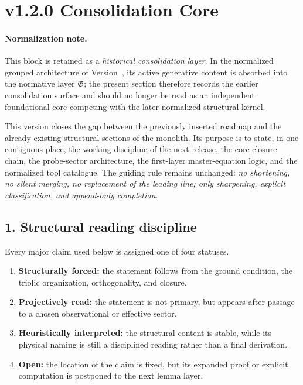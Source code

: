 \section*{v1.2.0 Consolidation Core}

\paragraph{Normalization note.} This block is retained as a \emph{historical consolidation layer}. In the normalized grouped architecture of Version~\docversion, its active generative content is absorbed into the normative layer $\mathfrak G$; the present section therefore records the earlier consolidation surface and should no longer be read as an independent foundational core competing with the later normalized structural kernel.


This version closes the gap between the previously inserted roadmap and the
already existing structural sections of the monolith. Its purpose is to state,
in one contiguous place, the working discipline of the next release, the core
closure chain, the probe-sector architecture, the first-layer master-equation
logic, and the normalized tool catalogue. The guiding rule remains unchanged:
\emph{no shortening, no silent merging, no replacement of the leading line;
only sharpening, explicit classification, and append-only completion.}

\subsection*{1. Structural reading discipline}
Every major claim used below is assigned one of four statuses.
\begin{enumerate}[leftmargin=2em,label=(\alph*)]
  \item \textbf{Structurally forced:} the statement follows from the ground
  condition, the triolic organization, orthogonality, and closure.
  \item \textbf{Projectively read:} the statement is not primary, but appears
  after passage to a chosen observational or effective sector.
  \item \textbf{Heuristically interpreted:} the structural content is stable,
  while its physical naming is still a disciplined reading rather than a final
  derivation.
  \item \textbf{Open:} the location of the claim is fixed, but its expanded
  proof or explicit computation is postponed to the next lemma layer.
\end{enumerate}

